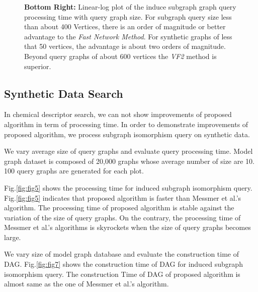 \begin{figure}[h]
{\textbf{Bottom Right:} Linear-log plot of the induce subgraph graph query processing time with query graph size. For subgraph query size less than about 400 Vertices, there is an order of magnitude or better advantage to the \textit{Fast Network Method}. For synthetic graphs of less that 50 vertices, the advantage is about two orders of magnitude. Beyond query graphs of about 600 vertices the \textit{VF2} method is superior.
}
\label{fig:fig91}
\end{figure}
%

\subsection{Synthetic Data Search}
In chemical descriptor search, we can not show improvements of proposed algorithm in term of processing time.
In order to demonstrate improvements of proposed algorithm, we process subgraph isomorphism query on synthetic data.

We vary average size of query graphs and evaluate query processing time.
Model graph dataset is composed of 20,000 graphs whose average number of size are 10.
100 query graphs are generated for each plot.



Fig.\ref{fig:fig5} shows the processing time for induced subgraph isomorphism query.
Fig.\ref{fig:fig5} indicates that proposed algorithm is faster than Messmer et al.'s algorithm.
The processing time of proposed algorithm is stable against the variation of the size of query graphs.
On the contrary, the processing time of Messmer et al.'s algorithms is skyrockets when the size of query graphs becomes large.




We vary size of model graph database and evaluate the construction time of DAG.
Fig.\ref{fig:fig7} shows the construction time of DAG for induced subgraph isomorphism query.
The construction Time of DAG of proposed algorithm is almost same as the one of Messmer et al.'s algorithm.



